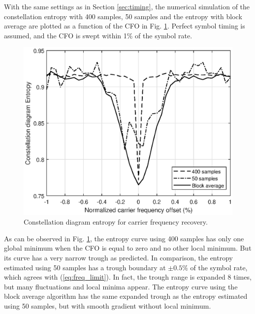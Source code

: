 \documentclass[journal,comsoc]{IEEEtran}
\begin{document}
With the same settings as in Section \ref{sec:timing}, the numerical simulation of the constellation entropy with 400 samples, 50 samples and the entropy with block average are plotted as a function of the CFO in Fig. \ref{fig:freq_entp}.
Perfect symbol timing is assumed, and the CFO is swept within 1\% of the symbol rate.



\begin{figure}[ht]
\centering
\includegraphics[width=3 in]{pic/freq-k.eps}
\caption{Constellation diagram entropy for carrier frequency recovery.}
\label{fig:freq_entp} 
\end{figure}   

As can be observed in Fig. \ref{fig:freq_entp}, the entropy curve using 400 samples has only one global minimum when the CFO is equal to zero and no other local minimum.
But its curve has a very narrow trough as predicted.
In comparison, the entropy estimated using 50 samples has a trough boundary at \(\pm 0.5\%\) of the symbol rate, which agrees with (\ref{eq:freq_limit}).
In fact, the trough range is expanded 8 times, but many fluctuations and local minima appear.
The entropy curve using the block average algorithm has the same expanded trough as the entropy estimated using 50 samples, but with smooth gradient without local minimum.
\end{document}

